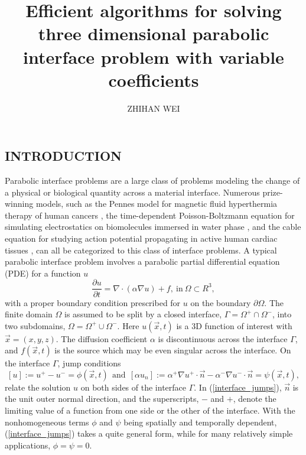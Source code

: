 \documentclass[dissertation]{uathesis}
\author{ZHIHAN WEI}       %
\title{Efficient algorithms for solving three dimensional parabolic interface problem with variable coefficients}
\begin{document}
\makefrontmatter

\begin{body}

\nocite{*}

\chapter{\MakeUppercase{Introduction}}\label{chap: introduction}

Parabolic interface problems are a large class of problems modeling the change of a physical or biological quantity across a material interface. Numerous prize-winning models, such as the Pennes model for magnetic fluid hyperthermia  therapy of human cancers \cite{pennes1948analysis}, the time-dependent Poisson-Boltzmann equation  for simulating electrostatics on biomolecules immersed in water phase \cite{geng2013,zhao2014operator}, and the cable equation for studying action potential propagating in active human cardiac tissues \cite{jack1975electric}, can all be categorized to this class of interface problems. 
A typical parabolic interface problem involves a parabolic 
partial differential equation (PDE) for a function $u$
%
\begin{equation}\label{heat_eqn}
\frac{\partial u}{\partial t} = \nabla \cdot (\alpha \nabla u)+f, ~ \mbox{in} ~\Omega \subset R^3,
\end{equation}
%
with a proper boundary condition prescribed for $u$ on the boundary $\partial \Omega$. The finite domain $\Omega$ is assumed to be split by a closed interface, $\Gamma = \Omega^{+} \cap \Omega^{-}$, into two subdomains, $\Omega = \Omega^{+} \cup \Omega^{-}$. Here $u(\vec{x},t)$ is a 3D function of interest with $\vec{x}=(x,y,z)$.  The diffusion coefficient $\alpha$ is discontinuous across the interface $\Gamma$, and $f(\vec{x},t)$ is the source which may be even singular across the interface. On the interface $\Gamma$, jump conditions
%
\begin{equation}\label{interface_jumps}
[u] := u^{+} - u^{-} = \phi(\vec{x},t) ~~ \mbox{and} ~~
[\alpha u_{n}] := \alpha^{+} \nabla u^{+} \cdot \vec {n} - \alpha^{-} \nabla u^{-} \cdot \vec {n} = \psi(\vec{x},t),
\end{equation}
%
relate the solution $u$ on both sides of the interface $\Gamma$. In (\ref{interface_jumps}), $\vec {n}$ is the unit outer normal direction, and the superscripts, $-$ and $+$, denote the limiting value of a function from one side or the other of the interface. With the nonhomogeneous terms $\phi$ and $\psi$ being spatially and temporally dependent, (\ref{interface_jumps}) takes a quite general form, while for many relatively simple applications, $\phi = \psi = 0$. 


\end{body}
\end{document}
